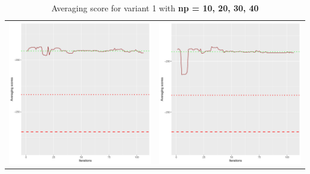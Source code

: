 \documentclass[]{scrartcl}
\begin{document}
\begin{table}[h!]
\begin{tabular}{cc}
\includegraphics[scale = 0.4]{./figs/asia/v1/30/avgBoundsEvolution-107.pdf} & 
\includegraphics[scale = 0.4]{./figs/asia/v1/40/avgBoundsEvolution-107.pdf} \\
\end{tabular}
\caption{Averaging score for variant 1 with \textbf{np =  10, 20, 30, 40}}
\end{table}
\end{document}
